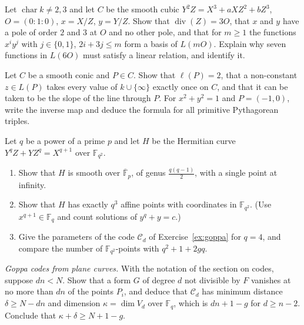 \begin{exercise}[$\star\star$]\label{ex:weierstrass}
Let $\operatorname{char}k\ne2,3$ and let $C$ be the smooth cubic $Y^2Z=X^3+aXZ^2+bZ^3$, $O=(0:1:0)$, $x=X/Z$, $y=Y/Z$. Show that $\operatorname{div}(Z)=3O$, that
$x$ and $y$ have a pole of order $2$ and $3$ at $O$ and no other pole, and that for $m\ge1$ the functions $x^iy^j$ with $j\in\{0,1\}$, $2i+3j\le m$ form a
basis of $L(mO)$. Explain why seven functions in $L(6O)$ must satisfy a linear relation, and identify it.
\end{exercise}

\begin{exercise}[$\star\star$]\label{ex:conic}
Let $C$ be a smooth conic and $P\in C$. Show that $\ell(P)=2$, that a non-constant $z\in L(P)$ takes every value of $k\cup\{\infty\}$ exactly once on $C$, and that
it can be taken to be the slope of the line through $P$. For $x^2+y^2=1$ and $P=(-1,0)$, write the inverse map and deduce the formula for all primitive
Pythagorean triples.
\end{exercise}

\begin{exercise}[$\star\star\star$]\label{ex:hermitian}
Let $q$ be a power of a prime $p$ and let $H$ be the Hermitian curve $Y^qZ+YZ^q=X^{q+1}$ over $\mathbb F_{q^2}$.
\begin{enumerate}[label=(\alph*)]
\item Show that $H$ is smooth over $\overline{\mathbb F}_p$, of genus $\frac{q(q-1)}2$, with a single point at infinity.
\item Show that $H$ has exactly $q^3$ affine points with coordinates in $\mathbb F_{q^2}$. (Use $x^{q+1}\in\mathbb F_q$ and count solutions of $y^q+y=c$.)
\item Give the parameters of the code $\mathcal C_d$ of Exercise~\ref{ex:goppa} for $q=4$, and compare the number of $\mathbb F_{q^2}$-points with
$q^2+1+2gq$.
\end{enumerate}
\end{exercise}

\begin{exercise}[$\star\star$]\label{ex:goppa}
\emph{Goppa codes from plane curves.} With the notation of the section on codes, suppose $dn<N$. Show that a form $G$ of degree $d$ not divisible by
$F$ vanishes at no more than $dn$ of the points $P_i$, and deduce that $\mathcal C_d$ has minimum distance $\delta\ge N-dn$ and dimension
$\kappa=\dim V_d$ over $\mathbb F_q$, which is $dn+1-g$ for $d\ge n-2$. Conclude that $\kappa+\delta\ge N+1-g$.
\end{exercise}

